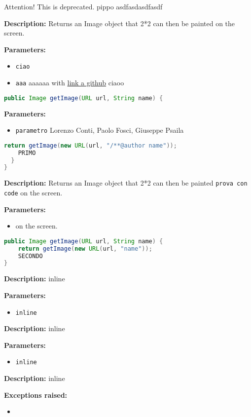 Attention! This is deprecated. pippo asdfasdasdfasdf

\textbf{Description:}
Returns an Image object that 2*2 can then be painted on the screen.

\textbf{Parameters:}
\begin{itemize}
  \item\texttt{ciao} 
  \item\texttt{aaa} aaaaaa with \href{https://github.com/test}{link a github}  ciaoo
\end{itemize}

\begin{lstlisting}[language=Java]
public Image getImage(URL url, String name) {
\end{lstlisting}
\textbf{Parameters:}
\begin{itemize}
  \item\texttt{parametro} Lorenzo Conti, Paolo Fosci, Giuseppe Psaila
\end{itemize}

\begin{lstlisting}[language=Java]
    return getImage(new URL(url, "/**@author name"));
    PRIMO
  }
}
\end{lstlisting}
\textbf{Description:}
Returns an Image object that 2*2 can then be painted \texttt{prova con code} on the screen.

\textbf{Parameters:}
\begin{itemize}
  \item\texttt{} on the screen.
\end{itemize}

\begin{lstlisting}[language=Java]
public Image getImage(URL url, String name) {
    return getImage(new URL(url, "name"));
    SECONDO
}
\end{lstlisting}
\textbf{Description:}
inline

\textbf{Parameters:}
\begin{itemize}
  \item\texttt{inline} 
\end{itemize}

\textbf{Description:}
inline

\textbf{Parameters:}
\begin{itemize}
  \item\texttt{inline} 
\end{itemize}

\textbf{Description:}
inline

\textbf{Exceptions raised:}
\begin{itemize}
  \item\texttt{} 
\end{itemize}

